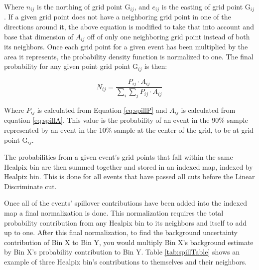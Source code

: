 Where $n_{i j}$ is the northing of grid point G$_{i j}$, and $e_{i j}$ is the easting of grid point G$_{i j}$.  If a given grid point does not have a neighboring grid point in one of the directions around it, the above equation is modified to take that into account and base that dimension of $A_{i j}$ off of only one neighboring grid point instead of both its neighbors.  Once each grid point for a given event has been multiplied by the area it represents, the probability density function is normalized to one.  The final probability for any given point grid point G$_{i j}$ is then:

\begin{equation}
N_{i j} = \frac{P_{i j} \cdot A_{i j}}{\sum_i \sum_j P_{i j} \cdot A_{i j}}
\end{equation}

Where $P_{i j}$ is calculated from Equation \ref{eq:spillP} and $A_{i j}$ is calculated from equation \ref{eq:spillA}.  This value is the probability of an event in the 90\% sample represented by an event in the 10\% sample at the center of the grid, to be at grid point G$_{i j}$.

The probabilities from a given event's grid points that fall within the same Healpix bin are then summed together and stored in an indexed map, indexed by Healpix bin.  This is done for all events that have passed all cuts before the Linear Discriminate cut. 

Once all of the events' spillover contributions have been added into the indexed map a final normalization is done.  This normalization requires the total probability contribution from any Healpix bin to its neighbors and itself to add up to one.  After this final normalization, to find the background uncertainty contribution of Bin X to Bin Y, you would multiply Bin X's background estimate by Bin X's probability contribution to Bin Y.  Table \ref{tab:spillTable} shows an example of three Healpix bin's contributions to themselves and their neighbors.  
 
